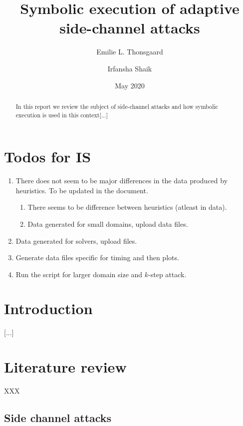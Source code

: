 \documentclass[11pt,a4paper,notitlepage]{article}
\title{Symbolic execution of adaptive side-channel attacks}
\author{Emilie L. Thonsgaard \and Irfansha Shaik}
\date{May 2020}
\begin{document}
\begin{titlingpage}
    \maketitle
    \begin{abstract}
        In this report we review the subject of side-channel attacks and how symbolic execution is used in this context[...]
    \end{abstract}
\end{titlingpage}

\tableofcontents
\newpage
\setcounter{section}{-1}


\section{Todos for IS}
\label{sec:todosforis}

\begin{enumerate}
  \item There does not seem to be major differences in the data produced by heuristics. To be updated in the document.
  \begin{enumerate}
    \item There seems to be difference between heuristics (atleast in data).
    \item Data generated for small domains, upload data files.
  \end{enumerate}
  \item Data generated for solvers, upload files.
  \item Generate data files specific for timing and then plots.
  \item Run the script for larger domain size and $k$-step attack.
\end{enumerate}

\newpage

\section{Introduction}
\label{cha:introduction}

[...]

\newpage

\section{Literature review}
\label{cha:literaturereview}

XXX

\subsection{Side channel attacks}
\label{sec:sidechannelattacks}
\end{document}
